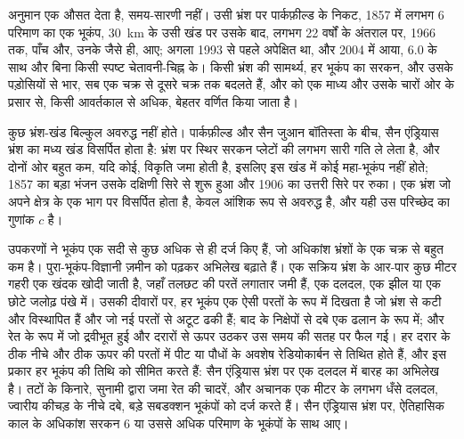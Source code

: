 अनुमान एक औसत देता है, समय-सारणी नहीं। उसी भ्रंश पर पार्कफ़ील्ड के निकट, 1857 में लगभग \num{6} परिमाण का एक भूकंप, \qty{30}{km} के उसी खंड पर उसके बाद, लगभग 22 वर्षों के अंतराल पर, 1966 तक, पाँच और, उनके जैसे ही, आए; अगला 1993 से पहले अपेक्षित था, और 2004 में आया, \num{6.0}  के साथ और बिना किसी स्पष्ट चेतावनी-चिह्न के। किसी भ्रंश की सामर्थ्य, हर भूकंप का सरकन, और उसके पड़ोसियों से भार, सब एक चक्र से दूसरे चक्र तक बदलते हैं, और  को एक माध्य  और उसके चारों ओर के प्रसार से, किसी आवर्तकाल से अधिक, बेहतर वर्णित किया जाता है।

कुछ भ्रंश-खंड बिल्कुल अवरुद्ध नहीं होते। पार्कफ़ील्ड और सैन जुआन बॉतिस्ता के बीच, सैन एंड्रियास भ्रंश का मध्य खंड विसर्पित होता है: भ्रंश पर स्थिर सरकन प्लेटों की लगभग सारी गति ले लेता है, और दोनों ओर बहुत कम, यदि कोई, विकृति जमा होती है, इसलिए इस खंड में कोई महा-भूकंप नहीं होते; 1857 का बड़ा भंजन उसके दक्षिणी सिरे से शुरू हुआ और 1906 का उत्तरी सिरे पर रुका। एक भ्रंश जो अपने क्षेत्र के एक भाग पर विसर्पित होता है, केवल आंशिक रूप से अवरुद्ध है, और यही उस परिच्छेद का गुणांक $c$ है।

\begin{inthefield}[खंदक में अतीत के भूकंप पढ़ना]
उपकरणों ने भूकंप एक सदी से कुछ अधिक से ही दर्ज किए हैं, जो अधिकांश भ्रंशों के एक चक्र से बहुत कम है। पुरा-भूकंप-विज्ञानी ज़मीन को पढ़कर अभिलेख बढ़ाते हैं। एक सक्रिय भ्रंश के आर-पार कुछ मीटर गहरी एक खंदक खोदी जाती है, जहाँ तलछट की परतें लगातार जमी हैं, एक दलदल, एक झील या एक छोटे जलोढ़ पंखे में। उसकी दीवारों पर, हर भूकंप एक ऐसी परतों के रूप में दिखता है जो भ्रंश से कटी और विस्थापित हैं और जो नई परतों से अटूट ढकी हैं; बाद के निक्षेपों से दबे एक ढलान के रूप में; और रेत के रूप में जो द्रवीभूत हुई और दरारों से ऊपर उठकर उस समय की सतह पर फैल गई। हर दरार के ठीक नीचे और ठीक ऊपर की परतों में पीट या पौधों के अवशेष रेडियोकार्बन से तिथित होते हैं, और इस प्रकार हर भूकंप की तिथि को सीमित करते हैं: सैन एंड्रियास भ्रंश पर एक दलदल में बारह का अभिलेख है। तटों के किनारे, सुनामी द्वारा जमा रेत की चादरें, और अचानक एक मीटर के लगभग धँसे दलदल, ज्वारीय कीचड़ के नीचे दबे, बड़े सबडक्शन भूकंपों को दर्ज करते हैं। सैन एंड्रियास भ्रंश पर, ऐतिहासिक काल के अधिकांश सरकन \num{6} या उससे अधिक परिमाण के भूकंपों के साथ आए।
\end{inthefield}

